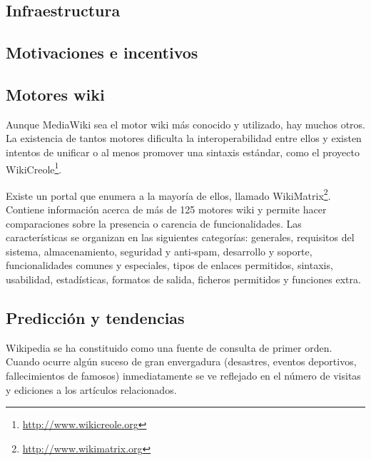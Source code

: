 \documentclass[11pt,onecolumn]{article}
\begin{document}
\subsection{Infraestructura}




\subsection{Motivaciones e incentivos}



\subsection{Motores wiki}

Aunque MediaWiki sea el motor wiki más conocido y utilizado, hay muchos otros. La existencia de tantos motores dificulta la interoperabilidad entre ellos y existen intentos de unificar o al menos promover una sintaxis estándar, como el proyecto WikiCreole\footnote{\href{http://www.wikicreole.org}{http://www.wikicreole.org}}.

Existe un portal que enumera a la mayoría de ellos, llamado WikiMatrix\footnote{\href{http://www.wikimatrix.org}{http://www.wikimatrix.org}}. Contiene información acerca de más de 125 motores wiki y permite hacer comparaciones sobre la presencia o carencia de funcionalidades. Las características se organizan en las siguientes categorías: generales, requisitos del sistema, almacenamiento, seguridad y anti-spam, desarrollo y soporte, funcionalidades comunes y especiales, tipos de enlaces permitidos, sintaxis, usabilidad, estadísticas, formatos de salida, ficheros permitidos y funciones extra.

\subsection{Predicción y tendencias}

Wikipedia se ha constituido como una fuente de consulta de primer orden. Cuando ocurre algún suceso de gran envergadura (desastres, eventos deportivos, fallecimientos de famosos) inmediatamente se ve reflejado en el número de visitas y ediciones a los artículos relacionados.
\end{document}
